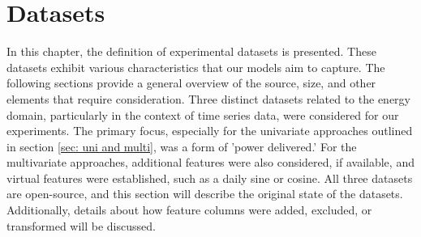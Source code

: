 \chapter{Datasets}
\label{sec:datasets}
In this chapter, the definition of experimental datasets is presented. These datasets exhibit various characteristics that our models aim to capture. The following sections provide a general overview of the source, size, and other elements that require consideration.
Three distinct datasets related to the energy domain, particularly in the context of time series data, were considered for our experiments. The primary focus, especially for the univariate approaches outlined in section \ref{sec: uni and multi}, was a form of 'power delivered.' For the multivariate approaches, additional features were also considered, if available, and virtual features were established, such as a daily sine or cosine.
All three datasets are open-source, and this section will describe the original state of the datasets. Additionally, details about how feature columns were added, excluded, or transformed will be discussed.
